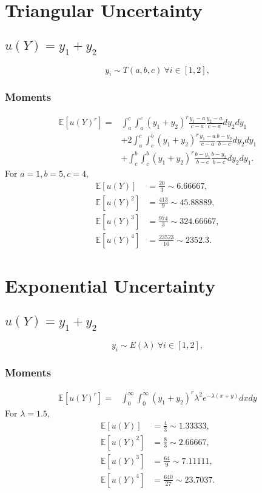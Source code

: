 \documentclass[11pt]{article}
\newcommand{\expv}[1]{\ensuremath{\mathbb{E}[ #1]}}
\begin{document}
\section{Triangular Uncertainty}

\subsection{$u(Y)=y_1+y_2$}
\[y_i \sim T(a,b,c)\ \forall i\in[1,2],\]
\subsubsection{Moments}
\begin{align}
\expv{u(Y)^r}=&\int_a^c\int_a^c(y_1+y_2)^r\frac{y_1-a}{c-a}\frac{y_2-a}{c-a}dy_2dy_1 \\
  &+2\int_a^c\int_c^b (y_1+y_2)^r\frac{y_1-a}{c-a}\frac{b-y_2}{b-c}dy_2 dy_1 \\
  &+\int_c^b\int_c^b (y_1+y_2)^r\frac{b-y_1}{b-c}\frac{b-y_2}{b-c}dy_2 dy_1.
\end{align}
For $a =1,b=5,c=4$,
\begin{align}
  \expv{u(Y)} &= \frac{20}{3}\sim6.66667,\\
  \expv{u(Y)^2} &=\frac{413}{9}\sim45.88889,\\
  \expv{u(Y)^3} &=\frac{974}{3}\sim324.66667,\\
  \expv{u(Y)^4} &=\frac{23523}{10}\sim2352.3.
\end{align}


\section{Exponential Uncertainty}

\subsection{$u(Y)=y_1+y_2$}
\[y_i \sim E(\lambda)\ \forall i\in[1,2],\]
\subsubsection{Moments}
\begin{align}
\expv{u(Y)^r}=&\int_0^\infty\int_0^\infty(y_1+y_2)^r\lambda^2e^{-\lambda(x+y)}dxdy
\end{align}
For $\lambda =1.5$,
\begin{align}
  \expv{u(Y)} &= \frac{4}{3}\sim1.33333,\\
  \expv{u(Y)^2} &=\frac{8}{3}\sim2.66667,\\
  \expv{u(Y)^3} &=\frac{64}{9}\sim7.11111,\\
  \expv{u(Y)^4} &=\frac{640}{27}\sim23.7037.
\end{align}
\end{document}
